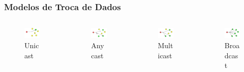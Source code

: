 \documentclass{beamer}
\begin{document}
\begin{frame}
\frametitle{Modelos de Troca de Dados}
\begin{columns}
  \begin{column}{0.25\textwidth}
	\begin{figure}[htp]
		\begin{center}
	  		\includegraphics[width=25mm]{Imagens/Unicast.png}
	  		\caption[Unicast]{Unicast}
		\end{center}
	\end{figure}
  \end{column}
  \begin{column}{0.25\textwidth}
	\begin{figure}[htp]
		\begin{center}
	  		\includegraphics[width=25mm]{Imagens/Anycast.png}
	  		\caption[Anycast]{Anycast}
		\end{center}
	\end{figure}
  \end{column}
  \begin{column}{0.25\textwidth}
	\begin{figure}[htp]
		\begin{center}
	  		\includegraphics[width=25mm]{Imagens/Multicast.png}
	  		\caption[Multicast]{Multicast}
		\end{center}
	\end{figure}
  \end{column}
  \begin{column}{0.25\textwidth}
	\begin{figure}[htp]
		\begin{center}
	  		\includegraphics[width=25mm]{Imagens/Broadcast.png}
		  	\caption[Broadcast]{Broadcast}
		\end{center}
	\end{figure}
  \end{column}
\end{columns}
\end{frame}
\end{document}
